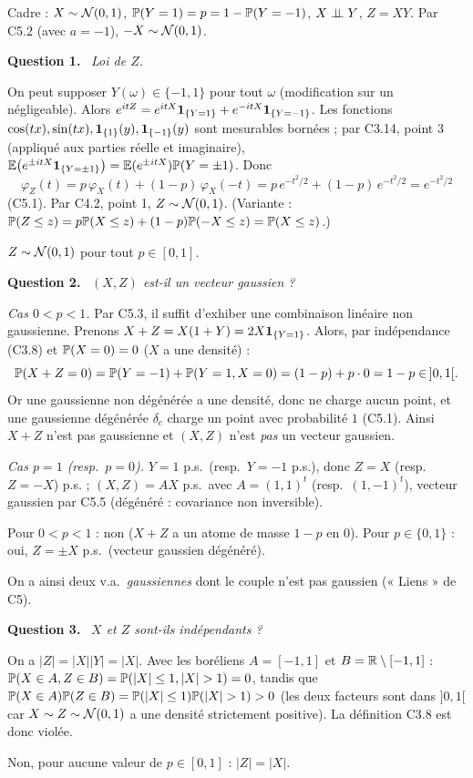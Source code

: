 \documentclass[11pt,a4paper]{article}
\newcommand{\question}[1]{\par\medskip\noindent\textbf{Question #1.}~}
\begin{document}
\begin{exo}[$Z=XY$ : gaussienne sans vecteur gaussien]

Cadre : $X\sim\mathcal{N}(0,1)$, $\mathbb{P}(Y=1)=p=1-\mathbb{P}(Y=-1)$, $X\perp\!\!\!\perp Y$, $Z=XY$. Par C5.2 (avec $a=-1$), $-X\sim\mathcal{N}(0,1)$.

\question{1} \emph{Loi de $Z$.}

On peut supposer $Y(\omega)\in\{-1,1\}$ pour tout $\omega$ (modification sur un négligeable). Alors
$e^{itZ}=e^{itX}\mathbf{1}_{\{Y=1\}}+e^{-itX}\mathbf{1}_{\{Y=-1\}}$. Les fonctions $\cos(tx),\sin(tx),\mathbf{1}_{\{1\}}(y),\mathbf{1}_{\{-1\}}(y)$ sont mesurables bornées ;
par C3.14, point 3 (appliqué aux parties réelle et imaginaire), $\mathbb{E}\bigl(e^{\pm itX}\mathbf{1}_{\{Y=\pm1\}}\bigr)=\mathbb{E}(e^{\pm itX})\mathbb{P}(Y=\pm1)$. Donc
\[\varphi_Z(t)=p\,\varphi_X(t)+(1-p)\,\varphi_X(-t)=p\,e^{-t^2/2}+(1-p)\,e^{-t^2/2}=e^{-t^2/2}\]
(C5.1). Par C4.2, point 1, $Z\sim\mathcal{N}(0,1)$. (Variante : $\mathbb{P}(Z\le z)=p\mathbb{P}(X\le z)+(1-p)\mathbb{P}(-X\le z)=\mathbb{P}(X\le z)$.)
\begin{resultat}
$Z\sim\mathcal{N}(0,1)$ pour tout $p\in[0,1]$.
\end{resultat}

\question{2} \emph{$(X,Z)$ est-il un vecteur gaussien ?}

\emph{Cas $0<p<1$.} Par C5.3, il suffit d'exhiber une combinaison linéaire non gaussienne. Prenons
$X+Z=X(1+Y)=2X\mathbf{1}_{\{Y=1\}}$. Alors, par indépendance (C3.8) et $\mathbb{P}(X=0)=0$ ($X$ a une densité) :
\[\mathbb{P}(X+Z=0)=\mathbb{P}(Y=-1)+\mathbb{P}(Y=1,X=0)=(1-p)+p\cdot0=1-p\in\,]0,1[ .\]
Or une gaussienne non dégénérée a une densité, donc ne charge aucun point, et une gaussienne dégénérée $\delta_c$ charge un point avec
probabilité $1$ (C5.1). Ainsi $X+Z$ n'est pas gaussienne et $(X,Z)$ n'est \emph{pas} un vecteur gaussien.

\emph{Cas $p=1$ (resp.\ $p=0$).} $Y=1$ p.s.\ (resp.\ $Y=-1$ p.s.), donc $Z=X$ (resp.\ $Z=-X$) p.s. ; $(X,Z)=AX$ p.s.\ avec
$A=(1,1)^t$ (resp.\ $(1,-1)^t$), vecteur gaussien par C5.5 (dégénéré : covariance non inversible).
\begin{resultat}
Pour $0<p<1$ : non ($X+Z$ a un atome de masse $1-p$ en $0$). Pour $p\in\{0,1\}$ : oui, $Z=\pm X$ p.s.\ (vecteur gaussien dégénéré).
\end{resultat}
On a ainsi deux v.a.\ \emph{gaussiennes} dont le couple n'est pas gaussien (« Liens » de C5).

\question{3} \emph{$X$ et $Z$ sont-ils indépendants ?}

On a $|Z|=|X||Y|=|X|$. Avec les boréliens $A=[-1,1]$ et $B=\mathbb{R}\setminus[-1,1]$ :
$\PP(X\in A,Z\in B)=\PP(|X|\le1,|X|>1)=0$, tandis que $\PP(X\in A)\PP(Z\in B)=\PP(|X|\le1)\PP(|X|>1)>0$ (les deux facteurs sont
dans $]0,1[$ car $X\sim Z\sim\mathcal{N}(0,1)$ a une densité strictement positive). La définition C3.8 est donc violée.
\begin{resultat}
Non, pour aucune valeur de $p\in[0,1]$ : $|Z|=|X|$.
\end{resultat}


\end{exo}
\end{document}
